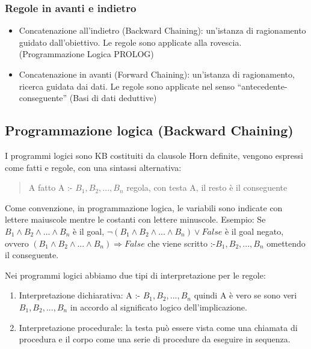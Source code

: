 \documentclass{article}
\begin{document}
\subsubsection{Regole in avanti e indietro}
\begin{itemize}
    \item Concatenazione all'indietro (Backward Chaining): un’istanza di ragionamento guidato dall'obiettivo. Le regole sono applicate alla rovescia. (Programmazione Logica PROLOG)
    \item Concatenazione in avanti (Forward Chaining): un'istanza di ragionamento, ricerca guidata dai dati. Le regole sono applicate nel senso “antecedente-conseguente” (Basi di dati deduttive)
\end{itemize}

\subsection{Programmazione logica (Backward Chaining)}
I programmi logici sono KB costituiti da clausole Horn definite, vengono espressi come fatti e regole, con una sintassi alternativa:
\begin{quote}
    A \quad fatto \newline
 	A :- $B_1, B_2, ... , B_n$ \quad regola, con testa A, il resto è il conseguente
\end{quote}
Come convenzione, in programmazione logica, le variabili sono indicate con lettere maiuscole mentre le costanti con lettere minuscole.
Esempio: \newline
Se $B_1 \land B_2 \land ... \land B_n$ \quad è il goal, \newline
$\neg (B_1 \land B_2 \land ... \land B_n) \lor False$ \quad è il goal negato, ovvero \newline
$(B_1 \land B_2 \land ... \land B_n) \Rightarrow False$ \quad che viene scritto \newline
:-$B_1, B_2, ..., B_n$ \quad omettendo il conseguente. \clearpage

Nei programmi logici abbiamo due tipi di interpretazione per le regole:
\begin{enumerate}
    \item Interpretazione dichiarativa:	A :- $B_1, B_2, ..., B_n$ quindi A è vero se sono veri $B_1, B_2, ..., B_n$ in accordo al significato logico dell'implicazione.
    \item Interpretazione procedurale: la testa può essere vista come una chiamata di procedura e il corpo come una serie di procedure da eseguire in sequenza.
\end{enumerate}
\end{document}
